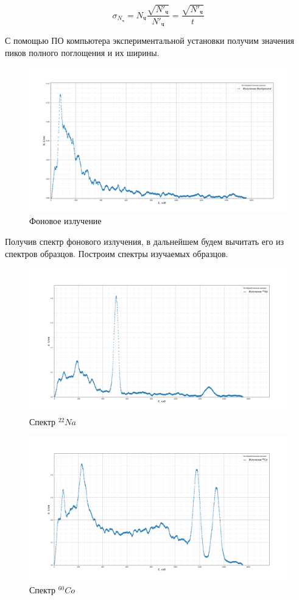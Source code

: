 \documentclass[a4paper,12pt]{article} %
\begin{document}
	\begin{equation}\label{}
		\sigma_{N_\text{ч}} = N_\text{ч}  \dfrac{\sqrt{N'_\text{ч}}}{N'_\text{ч}} = \dfrac{\sqrt{N'_\text{ч}}}{t}
	\end{equation}

	С помощью ПО компьютера экспериментальной установки получим значения пиков полного поглощения и их ширины.
	\begin{figure}[H]
		\centering
		\includegraphics[width=0.95\linewidth]{Bg}
		\caption{Фоновое излучение}
		\label{fig:bg}
	\end{figure}
	Получив спектр фонового излучения, в дальнейшем будем вычитать его из спектров образцов. Построим спектры изучаемых образцов.
	\begin{figure}[H]
		\centering
		\includegraphics[width=0.95\linewidth]{Na_22}
		\caption{Спектр $^{22}Na$}
		\label{fig:na22}
	\end{figure}
	\begin{figure}[H]
		\centering
		\includegraphics[width=0.95\linewidth]{Co_60}
		\caption{Спектр $^{60}Co$}
		\label{fig:co60}
	\end{figure}
\end{document}
